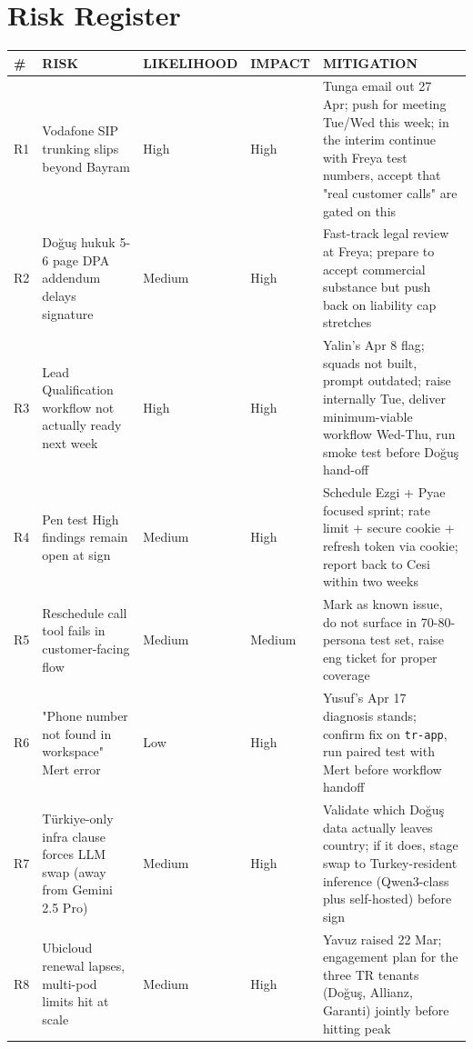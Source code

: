 \documentclass[10pt,a4paper]{article}
\begin{document}
\newpage

\section{Risk Register}

\begin{tabularx}{\linewidth}{@{}L{0.5cm}L{4.6cm}L{1.4cm}L{1.4cm}X@{}}
\toprule
{}\textbf{\color{white}\footnotesize \#} & \textbf{\color{white}\footnotesize RISK} & \textbf{\color{white}\footnotesize LIKELIHOOD} & \textbf{\color{white}\footnotesize IMPACT} & \textbf{\color{white}\footnotesize MITIGATION} \\
\midrule
R1 & Vodafone SIP trunking slips beyond Bayram                & High   & High   & Tunga email out 27 Apr; push for meeting Tue/Wed this week; in the interim continue with Freya test numbers, accept that "real customer calls" are gated on this \\
R2 & Doğuş hukuk 5-6 page DPA addendum delays signature        & Medium & High   & Fast-track legal review at Freya; prepare to accept commercial substance but push back on liability cap stretches \\
R3 & Lead Qualification workflow not actually ready next week  & High   & High   & Yalin's Apr 8 flag; squads not built, prompt outdated; raise internally Tue, deliver minimum-viable workflow Wed-Thu, run smoke test before Doğuş hand-off \\
R4 & Pen test High findings remain open at sign                 & Medium & High   & Schedule Ezgi + Pyae focused sprint; rate limit + secure cookie + refresh token via cookie; report back to Cesi within two weeks \\
R5 & Reschedule call tool fails in customer-facing flow        & Medium & Medium & Mark as known issue, do not surface in 70-80-persona test set, raise eng ticket for proper coverage \\
R6 & "Phone number not found in workspace" Mert error         & Low    & High   & Yusuf's Apr 17 diagnosis stands; confirm fix on \texttt{tr-app}, run paired test with Mert before workflow handoff \\
R7 & Türkiye-only infra clause forces LLM swap (away from Gemini 2.5 Pro) & Medium & High   & Validate which Doğuş data actually leaves country; if it does, stage swap to Turkey-resident inference (Qwen3-class plus self-hosted) before sign \\
R8 & Ubicloud renewal lapses, multi-pod limits hit at scale   & Medium & High   & Yavuz raised 22 Mar; engagement plan for the three TR tenants (Doğuş, Allianz, Garanti) jointly before hitting peak \\

\end{tabularx}
\end{document}
